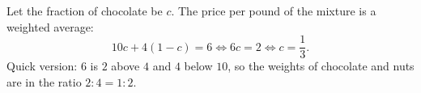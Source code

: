 Let the fraction of chocolate be $c$. The price per pound of the mixture is a weighted average:
\[
10c+4(1-c)=6\iff6c=2\iff c=\boxed{\dfrac{1}{3}}.
\]
Quick version: $6$ is $2$ above $4$ and $4$ below $10$, so the weights of chocolate and nuts are in the ratio $2:4=1:2$.
